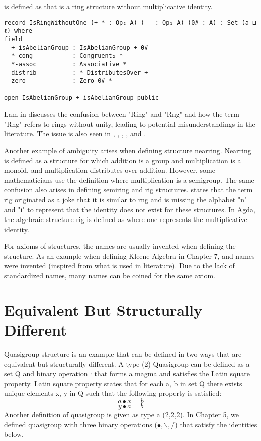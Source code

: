  is defined as  that is a ring structure without
multiplicative identity.

\begin{verbatim}
record IsRingWithoutOne (+ * : Op₂ A) (-_ : Op₁ A) (0# : A) : Set (a ⊔ ℓ) where
field
  +-isAbelianGroup : IsAbelianGroup + 0# -_
  *-cong           : Congruent₂ *
  *-assoc          : Associative *
  distrib          : * DistributesOver +
  zero             : Zero 0# *

open IsAbelianGroup +-isAbelianGroup public
\end{verbatim}

Lam in \cite{lam1991first} discusses the confusion between "Ring" and "Rng" and
how the term "Rng" refers to rings without unity, leading to potential
misunderstandings in the literature. The issue is also seen in
\cite{bosma1997magma}, \cite{jacobson1956structure},
\cite{persson1999application}, \cite{lehmann1977algebraic}, and
\cite{geuvers2002constructive}.

Another example of ambiguity arises when defining structure nearring. Nearring
is defined as a structure for which addition is a group and multiplication is a
monoid, and multiplication distributes over addition. However, some
mathematicians use the definition where multiplication is a semigroup. The same
confusion also arises in defining semiring and rig structures.
\cite{rasuli2022anti} states that the term rig originated as a joke that it is
similar to rng and is missing the alphabet "n" and "i" to represent that the
identity does not exist for these structures. In Agda, the algebraic structure
rig is defined as  where one represents the
multiplicative identity.

For axioms of structures, the names are usually invented when defining the
structure. As an example when defining Kleene Algebra in Chapter 7,
 and  names were invented
(inspired from what is used in literature). Due to the lack of standardized
names, many names can be coined for the same axiom. 

\section{Equivalent But Structurally Different}
Quasigroup structure is an example that can be defined in two ways that are
equivalent but structurally different. A type (2) Quasigroup can be defined as a
set Q and binary operation ∙ that forms a magma and satisfies the Latin square
property. Latin square property states that for each a, b in set Q there exists
unique elements x, y in Q such that the following property is satisfied:
\begin{equation}
a ∙ x = b
\end{equation}
\begin{equation}
y ∙ a = b
\end{equation}
Another definition of quasigroup is given as type a (2,2,2). In Chapter 5, we
defined quasigroup with three binary operations ($∙, \backslash, /$) that
satisfy the identities below.

